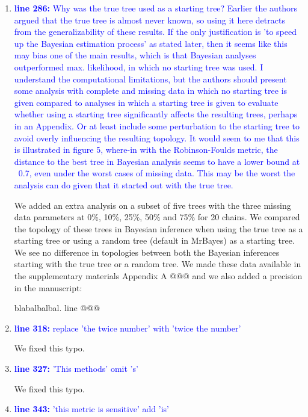 \documentclass[12pt,letterpaper]{article}
\begin{document}
\begin{enumerate}
\item{\textcolor{blue}{\textbf{line 286:} Why was the true tree used as a starting tree? Earlier the authors argued that the true tree is almost never known, so using it here detracts from the generalizability of these results. If the only justification is 'to speed up the Bayesian estimation process' as stated later, then it seems like this may bias one of the main results, which is that Bayesian analyses outperformed max. likelihood, in which no starting tree was used. I understand the computational limitations, but the authors should present some analysis with complete and missing data in which no starting tree is given compared to analyses in which a starting tree is given to evaluate whether using a starting tree significantly affects the resulting trees, perhaps in an Appendix. Or at least include some perturbation to the starting tree to avoid overly influencing the resulting topology. It would seem to me that this is illustrated in figure 5, where-in with the Robinson-Foulds metric, the distance to the best tree in Bayesian analysis seems to have a lower bound at ~0.7, even under the worst cases of missing data. This may be the worst the analysis can do given that it started out with the true tree. }}

We added an extra analysis on a subset of five trees with the three missing data parameters at 0\%, 10\%, 25\%, 50\% and 75\% for 20 chains. We compared the topology of these trees in Bayesian inference when using the true tree as a starting tree or using a random tree (default in MrBayes) as a starting tree. We see no difference in topologies between both the Bayesian inferences starting with the true tree or a random tree. We made these data available in the supplementary materials Appendix A @@@ and we also added a precision in the manuscript:

blabalbalbal. line @@@ 

\item{\textcolor{blue}{\textbf{line 318:} replace 'the twice number' with 'twice the number'}}

We fixed this typo.

\item{\textcolor{blue}{\textbf{line 327:} 'This methods' omit 's'}}

We fixed this typo.

\item{\textcolor{blue}{\textbf{line 343:} 'this metric is sensitive' add 'is'}}


\end{enumerate}
\end{document}
